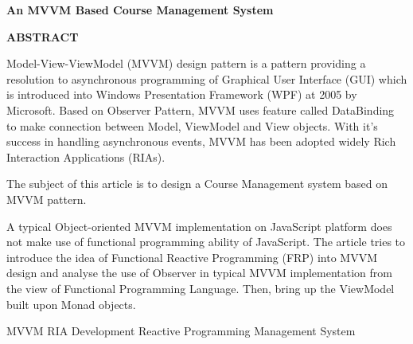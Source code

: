 \begin{center}
\textbf{An MVVM Based Course Management System}
\end{center}
\begin{center}
\textbf{ABSTRACT}
\end{center}
\vspace{2mm}

Model-View-ViewModel (MVVM) design pattern is a pattern providing a resolution to asynchronous programming of Graphical User Interface (GUI) which is introduced into Windows Presentation Framework (WPF) at 2005 by Microsoft. Based on Observer Pattern, MVVM uses feature called DataBinding to make connection between Model, ViewModel and View objects. With it's success in handling asynchronous events, MVVM has been adopted widely Rich Interaction Applications (RIAs).

The subject of this article is to design a Course Management system based on MVVM pattern.

A typical Object-oriented MVVM implementation on JavaScript platform does not make use of functional programming ability of JavaScript. The article tries to introduce the idea of Functional Reactive Programming (FRP) into MVVM design and analyse the use of Observer in typical MVVM implementation from the view of Functional Programming Language. Then, bring up the ViewModel built upon Monad objects.

\vspace{3mm}
\quad MVVM \quad RIA Development \quad Reactive Programming \quad Management System
